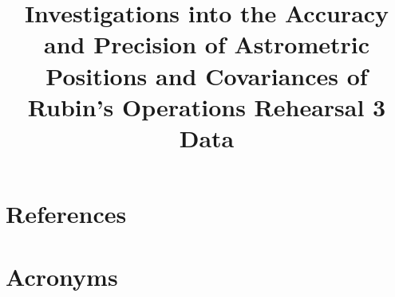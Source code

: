 \documentclass[SE,lsstdraft,authoryear,toc]{lsstdoc}
\title{Investigations into the Accuracy and Precision of Astrometric Positions and Covariances of Rubin's Operations Rehearsal 3 Data}
\date{\vcsDate}
\begin{document}
\maketitle


\appendix
\section{References} \label{sec:bib}
\renewcommand{\refname}{} %


\section{Acronyms} \label{sec:acronyms}

\end{document}
